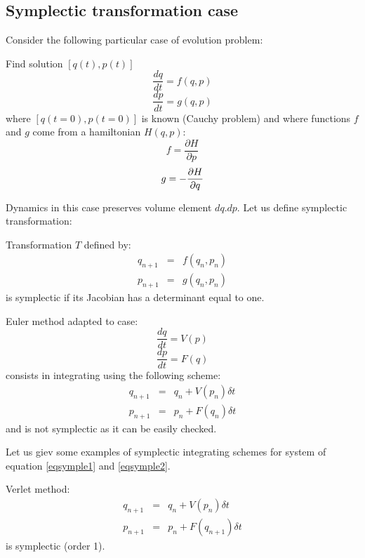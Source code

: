 \documentclass[12pt]{book}
\begin{document}
\subsection{Symplectic transformation case}
Consider the following particular case of
evolution problem:  
\begin{prob}
Find solution $[q(t),p(t)]$
\begin{equation}
\frac{dq}{dt}=f(q,p)
\end{equation}
\begin{equation}
\frac{dp}{dt}=g(q,p)
\end{equation}
where $[q(t=0),p(t=0)]$ is known (Cauchy problem) and where functions $f$ and
$g$ come from a hamiltonian $H(q,p)$:
\begin{equation}
f=\frac{\partial H}{\partial p}
\end{equation}
\begin{equation}
g=-\frac{\partial H}{\partial q}\\
\end{equation}
\end{prob}
Dynamics in this case preserves volume element $dq.dp$. Let us define
symplectic transformation:
\begin{defn}
Transformation $T$ defined by:
\begin{eqnarray}
q_{n+1}&=&f(q_n,p_n)\\
p_{n+1}&=&g(q_n,p_n)
\end{eqnarray}
is symplectic if its Jacobian has a determinant equal to one.
\end{defn}
\begin{rem}
Euler method adapted to case:
\begin{equation}
\frac{dq}{dt}=V(p)\label{eqsymple1}
\end{equation}
\begin{equation}\label{eqsymple2}
\frac{dp}{dt}=F(q)
\end{equation}
consists in integrating using the following scheme:
\begin{eqnarray}
q_{n+1}&=&q_n+V(p_n)\delta t\\
p_{n+1}&=&p_n+F(q_n)\delta t
\end{eqnarray}
and is not symplectic as it can be easily checked.
\end{rem}
Let us giev some examples of symplectic integrating schemes for system
of equation \ref{eqsymple1} and \ref{eqsymple2}.
\begin{exmp}
Verlet method:
\begin{eqnarray}
q_{n+1}&=&q_n+V(p_n)\delta t\\
p_{n+1}&=&p_n+F(q_{n+1})\delta t
\end{eqnarray}
is symplectic (order 1).
\end{exmp}
\end{document}
